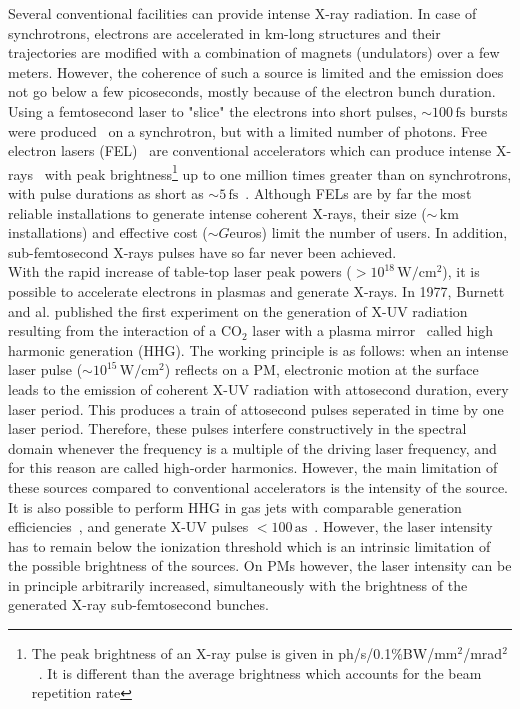 \noindent Several conventional facilities can provide intense X-ray radiation. In case of synchrotrons, electrons are accelerated in km-long structures and their trajectories are modified with a combination of magnets (undulators) over a few meters. However, the coherence of such a source is limited and the emission does not go below a few picoseconds, mostly because of the electron bunch duration. Using a femtosecond laser to "slice" the electrons into short pulses, $\sim100\,\mathrm{fs}$ bursts were produced~\cite{schoenlein2000generation} on a synchrotron, but with a limited number of photons.
Free electron lasers (FEL)~\cite{madey1971stimulated,emma2010first,ribic2012status,corde2013femtosecond} are conventional accelerators which can produce intense X-rays~\cite{geloni2010coherence} with peak brightness\footnote{The peak brightness of an X-ray pulse is given in ph/s/0.1\%BW/mm$^2$/mrad$^2$~\cite{corde2013femtosecond}. It is different than the average brightness which accounts for the beam repetition rate} up to one million times greater than on synchrotrons, with pulse durations as short as $\sim 5\,\mathrm{fs}$~\cite{helml2014measuring}.  Although FELs are by far the most reliable installations to generate intense coherent X-rays, their size ($\sim  \,\mathrm{km}$ installations) and effective cost ($\sim G$euros) limit the number of users. In addition, sub-femtosecond X-rays pulses have so far never been achieved.\\

\noindent With the rapid increase of table-top laser peak powers ($> 10^{18}\,\mathrm{W/cm^2}$), it is possible to accelerate electrons in plasmas and generate X-rays. In 1977, Burnett and al. published the first experiment on the generation of X-UV radiation resulting from the interaction of a $\mathrm{CO}_2 $ laser with a plasma mirror~\cite{burnett1977harmonic} called high harmonic generation (HHG). The working principle is as follows: when an intense  laser pulse ($\sim 10^{15}\,\mathrm{W/cm^2}$)  reflects on a PM, electronic motion at the surface leads to the emission of coherent X-UV radiation with attosecond duration, every laser period. This produces a train of attosecond pulses seperated in time by one laser period. Therefore, these pulses interfere constructively in the spectral domain whenever the frequency is a multiple of the driving laser frequency, and for this reason are called high-order harmonics. However, the main limitation of these sources compared to conventional accelerators is the intensity of the source. It is also possible to perform HHG in gas jets with comparable generation efficiencies~\cite{sarukura1991coherent,macklin1993high,l1993high}, and generate X-UV pulses $<100\,\mathrm{as}$~\cite{zhao2012tailoring,goulielmakis2008single}. However, the laser intensity has to remain below the ionization threshold which is an intrinsic limitation of the possible brightness of the sources. On PMs however, the laser intensity can be in principle arbitrarily increased, simultaneously with the  brightness of the generated  X-ray sub-femtosecond bunches.\\

